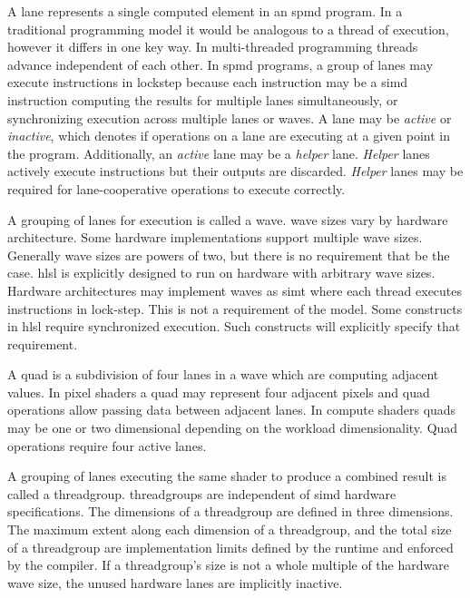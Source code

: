 
\p A \gls{lane} represents a single computed element in an \acrshort{spmd}
program. In a traditional programming model it would be analogous to a thread of
execution, however it differs in one key way. In multi-threaded programming
threads advance independent of each other. In \acrshort{spmd} programs, a group
of \gls{lane}s may execute instructions in lockstep because each instruction may
be a \acrshort{simd} instruction computing the results for multiple \gls{lane}s
simultaneously, or synchronizing execution across multiple \gls{lane}s or
\gls{wave}s. A lane may be \textit{active} or \textit{inactive}, which denotes
if operations on a lane are executing at a given point in the program.
Additionally, an \textit{active} lane may be a \textit{helper} lane.
\textit{Helper} lanes actively execute instructions but their outputs are
discarded. \textit{Helper} lanes may be required for \gls{lane}-cooperative
operations to execute correctly.


\p A grouping of \gls{lane}s for execution is called a \gls{wave}. \gls{wave}
sizes vary by hardware architecture. Some hardware implementations support
multiple wave sizes. Generally wave sizes are powers of two, but there is no
requirement that be the case. \acrshort{hlsl} is explicitly designed to run on
hardware with arbitrary \gls{wave} sizes. Hardware architectures may implement
\gls{wave}s as \acrfull{simt} where each thread executes instructions in
lock-step. This is not a requirement of the model. Some constructs in
\acrshort{hlsl} require synchronized execution. Such constructs will explicitly
specify that requirement.


\p A \gls{quad} is a subdivision of four \gls{lane}s in a \gls{wave} which are
computing adjacent values. In pixel shaders a \gls{quad} may represent four
adjacent pixels and \gls{quad} operations allow passing data between adjacent
\gls{lane}s. In compute shaders quads may be one or two dimensional depending
on the workload dimensionality. Quad operations require four active \gls{lane}s.


\p A grouping of \gls{lane}s executing the same shader to produce a combined
result is called a \gls{threadgroup}. \gls{threadgroup}s are independent of
\acrshort{simd} hardware specifications. The dimensions of a \gls{threadgroup}
are defined in three dimensions. The maximum extent along each dimension of a
\gls{threadgroup}, and the total size of a \gls{threadgroup} are implementation
limits defined by the runtime and enforced by the compiler. If a
\gls{threadgroup}'s size is not a whole multiple of the hardware \gls{wave}
size, the unused hardware \gls{lane}s are implicitly inactive.


